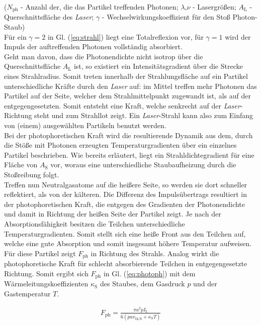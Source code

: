 \documentclass[numbers=noenddot,a4paper]{scrartcl}
\newcommand{\ix}[1]{_\text{#1}}
\newcommand{\tilt}[1]{\textit{#1}}
\begin{document}
				($N\ix{ph}$ - Anzahl der, die das Partikel treffenden Photonen; $\lambda$,$\nu$ - Lasergrößen; $A\ix{L}$ - Querschnittsfläche des \tilt{Laser}; $\gamma$ - Wechselwirkungskoeffizient für den Stoß Photon-Staub)\\
				Für ein $\gamma=2$ in Gl. (\ref{eq:strahl}) liegt eine Totalreflexion vor, für $\gamma=1$ wird der Impuls der auftreffenden Photonen vollständig absorbiert.\\
				Geht man davon, dass die Photonendichte nicht isotrop über die Querschnittsfläche $A\ix{L}$ ist, so existiert ein Intensitätsgradient über die Strecke eines Strahlradius. Somit treten innerhalb der Strahlungsfläche auf ein Partikel unterschiedliche Kräfte durch den \tilt{Laser} auf: im Mittel treffen mehr Photonen das Partikel auf der Seite, welcher dem Strahlmittelpunkt zugewandt ist, als auf der entgegengesetzten. Somit entsteht eine Kraft, welche senkrecht auf der \tilt{Laser}-Richtung steht und zum Strahllot zeigt. Ein \tilt{Laser}-Strahl kann also zum Einfang von (einem) ausgewählten Partikeln benutzt werden.\\
				Bei der photophoretischen Kraft wird die resultierende Dynamik aus dem, durch die Stöße mit Photonen erzeugten Temperaturgradienten über ein einzelnes Partikel beschrieben. Wie bereits erläutert, liegt ein Strahldichtegradient für eine Fläche von $A\ix{S}$ vor, woraus eine unterschiedliche Staubaufheizung durch die Stoßreibung folgt.\\
				Treffen nun Neutralgasatome auf die heißere Seite, so werden sie dort schneller reflektiert, als von der kälteren. Die Differenz des Impulsübertrags resultiert in der photophoretischen Kraft, die entgegen des Gradienten der Photonendichte und damit in Richtung der heißen Seite der Partikel zeigt. Je nach der Absorptionsfähigkeit besitzen die Teilchen unterschiedliche Temperaturgradienten. Somit stellt sich eine heiße Front aus den Teilchen auf, welche eine gute Absorption und somit insgesamt höhere Temperatur aufweisen. Für diese Partikel zeigt $F\ix{ph}$ in Richtung des Strahls. Analog wirkt die photophoretische Kraft für schlecht absorbierende Teilchen in entgegengesetzte Richtung. Somit ergibt sich $F\ix{ph}$ in Gl. (\ref{eq:photoph}) mit dem Wärmeleitungskoeffizienten $\kappa\ix{S}$ des Staubes, dem Gasdruck $p$ und der Gastemperatur $T$.
				
					\begin{align}
						F\ix{ph}=\frac{\pi a^2 p I\ix{L}}{6\left(pav\ix{th,N}+\kappa\ix{S}T\right)} \label{eq:photoph}
					\end{align}
				
\end{document}
